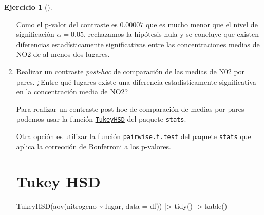 \documentclass[
  a4paper,
]{scrreport}
\newenvironment{Shaded}{\begin{snugshade}}{\end{snugshade}}
\newcommand{\AttributeTok}[1]{\textcolor[rgb]{0.40,0.45,0.13}{#1}}
\newcommand{\FunctionTok}[1]{\textcolor[rgb]{0.28,0.35,0.67}{#1}}
\newcommand{\NormalTok}[1]{\textcolor[rgb]{0.00,0.23,0.31}{#1}}
\newcommand{\SpecialCharTok}[1]{\textcolor[rgb]{0.37,0.37,0.37}{#1}}
\theoremstyle{definition}
\newtheorem{exercise}{Ejercicio}[chapter]
\theoremstyle{remark}
\begin{document}
\begin{exercise}[]
\begin{enumerate}
\begin{tcolorbox}
  Como el p-valor del contraste es \(0.00007\) que es mucho menor que el
  nivel de significación \(\alpha=0.05\), rechazamos la hipótesis nula y
  se concluye que existen diferencias estadísticamente significativas
  entre las concentraciones medias de NO2 de al menos dos lugares.

  \end{tcolorbox}
\item
  Realizar un contraste \emph{post-hoc} de comparación de las medias de
  N02 por pares. ¿Entre qué lugares existe una diferencia
  estadísticamente significativa en la concentración media de NO2?

  \begin{tcolorbox}[enhanced jigsaw, coltitle=black, left=2mm, colback=white, leftrule=.75mm, toptitle=1mm, breakable, bottomrule=.15mm, titlerule=0mm, bottomtitle=1mm, title=\textcolor{quarto-callout-note-color}{\faInfo}\hspace{0.5em}{Ayuda}, arc=.35mm, toprule=.15mm, rightrule=.15mm, colframe=quarto-callout-note-color-frame, opacityback=0, colbacktitle=quarto-callout-note-color!10!white, opacitybacktitle=0.6]

  Para realizar un contraste post-hoc de comparación de medias por pares
  podemos usar la función
  \href{https://rdrr.io/r/stats/TukeyHSD.html}{\texttt{TukeyHSD}} del
  paquete \texttt{stats}.

  Otra opción es utilizar la función
  \href{https://rdrr.io/r/stats/pairwise.t.test.html}{\texttt{pairwise.t.test}}
  del paquete \texttt{stats} que aplica la corrección de Bonferroni a
  los p-valores.

  \end{tcolorbox}

  \begin{tcolorbox}[enhanced jigsaw, coltitle=black, left=2mm, colback=white, leftrule=.75mm, toptitle=1mm, breakable, bottomrule=.15mm, titlerule=0mm, bottomtitle=1mm, title=\textcolor{quarto-callout-tip-color}{\faLightbulb}\hspace{0.5em}{Solución}, arc=.35mm, toprule=.15mm, rightrule=.15mm, colframe=quarto-callout-tip-color-frame, opacityback=0, colbacktitle=quarto-callout-tip-color!10!white, opacitybacktitle=0.6]

  \section{Tukey HSD}

\begin{Shaded}
\begin{Highlighting}[]
\FunctionTok{TukeyHSD}\NormalTok{(}\FunctionTok{aov}\NormalTok{(nitrogeno }\SpecialCharTok{\textasciitilde{}}\NormalTok{ lugar, }\AttributeTok{data =}\NormalTok{ df)) }\SpecialCharTok{|\textgreater{}} 
    \FunctionTok{tidy}\NormalTok{() }\SpecialCharTok{|\textgreater{}} 
    \FunctionTok{kable}\NormalTok{()}
\end{Highlighting}
\end{Shaded}


\end{tcolorbox}
\end{enumerate}
\end{exercise}
\end{document}
